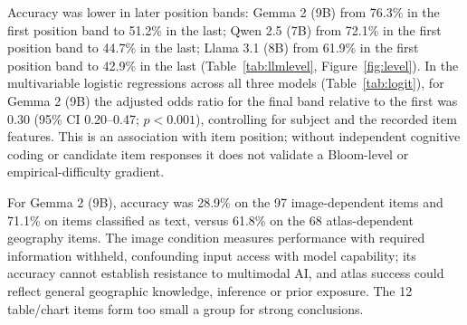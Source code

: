Accuracy was lower in later position bands: Gemma 2 (9B) from 76.3\% in the first position band to 51.2\% in the last; Qwen 2.5 (7B) from 72.1\% in the first position band to 44.7\% in the last; Llama 3.1 (8B) from 61.9\% in the first position band to 42.9\% in the last (Table~\ref{tab:llmlevel}, Figure~\ref{fig:level}). In the multivariable logistic regressions across all three models (Table~\ref{tab:logit}), for Gemma 2 (9B) the adjusted odds ratio for the final band relative to the first was 0.30 (95\% CI 0.20--0.47; $p<0.001$), controlling for subject and the recorded item features. This is an association with item position; without independent cognitive coding or candidate item responses it does not validate a Bloom-level or empirical-difficulty gradient.

For Gemma 2 (9B), accuracy was 28.9\% on the 97 image-dependent items and 71.1\% on items classified as text, versus 61.8\% on the 68 atlas-dependent geography items. The image condition measures performance with required information withheld, confounding input access with model capability; its accuracy cannot establish resistance to multimodal AI, and atlas success could reflect general geographic knowledge, inference or prior exposure. The 12 table/chart items form too small a group for strong conclusions.
